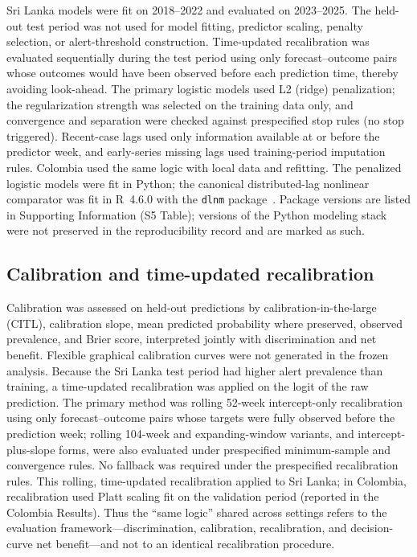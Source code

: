 \documentclass[11pt,a4paper]{article}
\begin{document}
Sri Lanka models were fit on 2018--2022 and evaluated on 2023--2025. The held-out test period was not used for model fitting, predictor scaling, penalty selection, or alert-threshold construction. Time-updated recalibration was evaluated sequentially during the test period using only forecast--outcome pairs whose outcomes would have been observed before each prediction time, thereby avoiding look-ahead. The primary logistic models used L2 (ridge) penalization; the regularization strength was selected on the training data only, and convergence and separation were checked against prespecified stop rules (no stop triggered). Recent-case lags used only information available at or before the predictor week, and early-series missing lags used training-period imputation rules. Colombia used the same logic with local data and refitting. The penalized logistic models were fit in Python; the canonical distributed-lag nonlinear comparator was fit in R~4.6.0 with the \texttt{dlnm} package~\cite{RCoreTeam2026,Gasparrini2011}. Package versions are listed in Supporting Information (S5 Table); versions of the Python modeling stack were not preserved in the reproducibility record and are marked as such.

\subsection{Calibration and time-updated recalibration}
Calibration was assessed on held-out predictions by calibration-in-the-large (CITL), calibration slope, mean predicted probability where preserved, observed prevalence, and Brier score, interpreted jointly with discrimination and net benefit. Flexible graphical calibration curves were not generated in the frozen analysis. Because the Sri Lanka test period had higher alert prevalence than training, a time-updated recalibration was applied on the logit of the raw prediction. The primary method was rolling 52-week intercept-only recalibration using only forecast--outcome pairs whose targets were fully observed before the prediction week; rolling 104-week and expanding-window variants, and intercept-plus-slope forms, were also evaluated under prespecified minimum-sample and convergence rules. No fallback was required under the prespecified recalibration rules. This rolling, time-updated recalibration applied to Sri Lanka; in Colombia, recalibration used Platt scaling fit on the validation period (reported in the Colombia Results). Thus the ``same logic'' shared across settings refers to the evaluation framework---discrimination, calibration, recalibration, and decision-curve net benefit---and not to an identical recalibration procedure.
\end{document}
